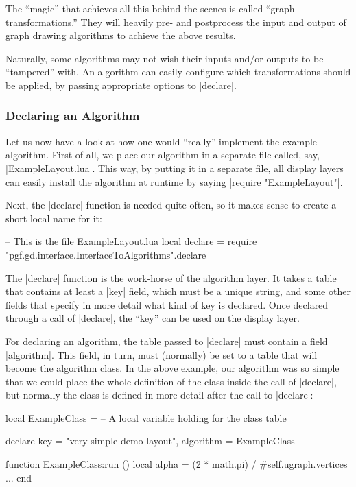 The ``magic'' that achieves all this behind the scenes is called 
``graph transformations.'' They will heavily pre- and postprocess the
input and output of graph drawing algorithms to achieve the above
results. 

Naturally, some algorithms may not wish their inputs and/or
outputs to be ``tampered'' with. An algorithm can easily configure
which transformations should be applied, by passing appropriate options
to |declare|.


\subsubsection{Declaring an Algorithm}

Let us now have a look at how one would ``really'' implement the
example algorithm. First of all, we place our algorithm in a
separate file called, say, |ExampleLayout.lua|. This way, by putting
it in a separate file, all display layers can easily install the
algorithm at runtime by saying |require "ExampleLayout"|.

Next, the |declare| function is needed quite often, so it makes sense
to create a short local name for it:

\begin{codeexample}
-- This is the file ExampleLayout.lua
local declare = require "pgf.gd.interface.InterfaceToAlgorithms".declare  
\end{codeexample}

The |declare| function is the work-horse of the algorithm layer. It
takes a table that contains at least a |key| field, which must be a
unique string, and some other fields that specify in more detail what
kind of key is declared. Once declared through a call of |declare|,
the ``key'' can be used on the display layer.

For declaring an algorithm, the table passed to |declare| must contain
a field |algorithm|. This field, in turn, must (normally) be set to a
table that will become the algorithm class. In the above example, our
algorithm was so simple that we could place the whole definition of
the class inside the call of |declare|, but normally the class is
defined in more detail after the call to |declare|:

\begin{codeexample}
local ExampleClass = {}  -- A local variable holding for the class table

declare {
  key = "very simple demo layout",
  algorithm = ExampleClass
}

function ExampleClass:run ()
  local alpha = (2 * math.pi) / #self.ugraph.vertices
  ...
end
\end{codeexample}

